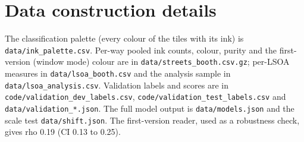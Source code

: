 \documentclass[11pt,a4paper]{article}
\begin{document}
\appendix
\section{Data construction details}
\label{app:data}
\sloppy
The classification palette (every colour of the tiles with its ink) is \texttt{data/ink\_palette.csv}. Per-way pooled ink counts, colour, purity and the first-version (window mode) colour are in \texttt{data/streets\_booth.csv.gz}; per-LSOA measures in \texttt{data/lsoa\_booth.csv} and the analysis sample in \texttt{data/lsoa\_analysis.csv}. Validation labels and scores are in \texttt{code/validation\_dev\_labels.csv}, \texttt{code/validation\_test\_labels.csv} and \texttt{data/validation\_*.json}. The full model output is \texttt{data/models.json} and the scale test \texttt{data/shift.json}. The first-version reader, used as a robustness check, gives rho 0.19 (CI 0.13 to 0.25).
\end{document}
